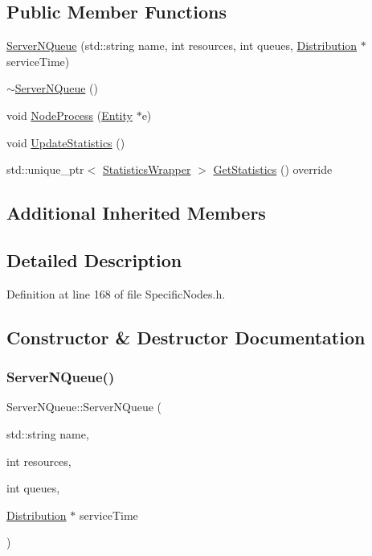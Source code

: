 \subsection*{Public Member Functions}
\begin{DoxyCompactItemize}
\item 
\hyperlink{class_server_n_queue_a7d669a398b47382358b2cd7b28e6012a}{Server\+N\+Queue} (std\+::string name, int resources, int queues, \hyperlink{class_distribution}{Distribution} $\ast$service\+Time)
\item 
\hyperlink{class_server_n_queue_ab13c0aee5829a612bf6bda12c82ad6b7}{$\sim$\+Server\+N\+Queue} ()
\item 
void \hyperlink{class_server_n_queue_adbc0e634171f6dc0785f2e49659663f7}{Node\+Process} (\hyperlink{class_entity}{Entity} $\ast$e)
\item 
void \hyperlink{class_server_n_queue_a08260b431df7adc0495f2e6c1d3ff33f}{Update\+Statistics} ()
\item 
std\+::unique\+\_\+ptr$<$ \hyperlink{class_generic_node_1_1_statistics_wrapper}{Statistics\+Wrapper} $>$ \hyperlink{class_server_n_queue_a18718f3796f33fa0f9d9100c34a6a7dc}{Get\+Statistics} () override
\end{DoxyCompactItemize}
\subsection*{Additional Inherited Members}


\subsection{Detailed Description}


Definition at line 168 of file Specific\+Nodes.\+h.



\subsection{Constructor \& Destructor Documentation}
\mbox{\label{class_server_n_queue_a7d669a398b47382358b2cd7b28e6012a}} 
\subsubsection{\texorpdfstring{Server\+N\+Queue()}{ServerNQueue()}}
{\footnotesize\ttfamily Server\+N\+Queue\+::\+Server\+N\+Queue (\begin{DoxyParamCaption}\item[{std\+::string}]{name,  }\item[{int}]{resources,  }\item[{int}]{queues,  }\item[{\hyperlink{class_distribution}{Distribution} $\ast$}]{service\+Time }\end{DoxyParamCaption})}



